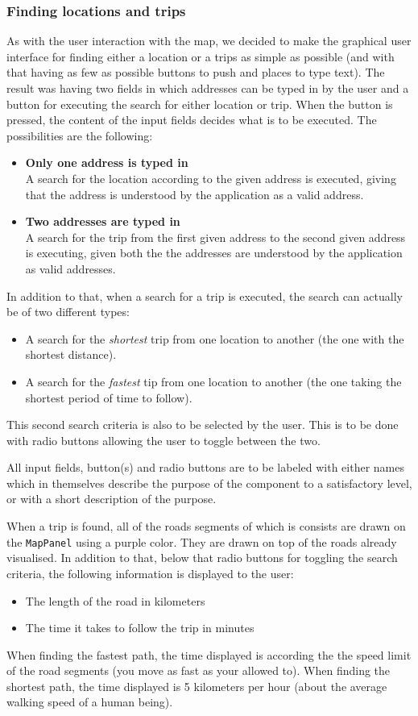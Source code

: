 \subsubsection{Finding locations and trips}
As with the user interaction with the map, we decided to make the graphical user interface for finding either a location or a trips as simple as possible (and with that having as few as possible buttons to push and places to type text). The result was having two fields in which addresses can be typed in by the user and a button for executing the search for either location or trip. When the button is pressed, the content of the input fields decides what is to be executed. The possibilities are the following:
\begin{itemize}
	\item \textbf{Only one address is typed in} \\
		A search for the location according to the given address is executed, giving that the address is understood by the application as a valid address.
	\item \textbf{Two addresses are typed in} \\
		A search for the trip from the first given address to the second given address is executing, given both the the addresses are understood by the application as valid addresses.
\end{itemize}
In addition to that, when a search for a trip is executed, the search can actually be of two different types:
\begin{itemize}
	\item A search for the \textit{shortest} trip from one location to another (the one with the shortest distance).
	\item A search for the \textit{fastest} tip from one location to another (the one taking the shortest period of time to follow).
\end{itemize}
This second search criteria is also to be selected by the user. This is to be done with radio buttons allowing the user to toggle between the two.

All input fields, button(s) and radio buttons are to be labeled with either names which in themselves describe the purpose of the component to a satisfactory level, or with a short description of the purpose.

When a trip is found, all of the roads segments of which is consists are drawn on the \texttt{MapPanel} using a purple color. They are drawn on top of the roads already visualised. In addition to that, below that radio buttons for toggling the search criteria, the following information is displayed to the user:
\begin{itemize}
	\item The length of the road in kilometers
	\item The time it takes to follow the trip in minutes
\end{itemize}
When finding the fastest path, the time displayed is according the the speed limit of the road segments (you move as fast as your allowed to). When finding the shortest path, the time displayed is 5 kilometers per hour (about the average walking speed of a human being).

